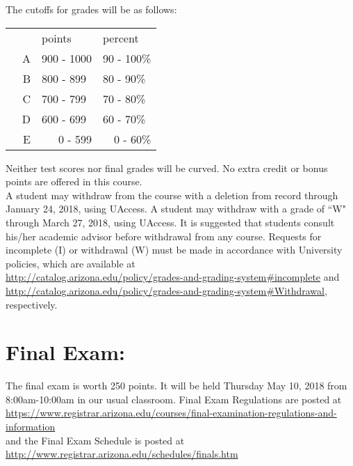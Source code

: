\documentclass[11pt]{article}
\begin{document}
\newpage
\hangindent=5cm 
The cutoffs for grades will be as follows:
\begin{center}
\begin{tabular}{rll}
  & points & percent \\[2mm]
~~A & 900 - 1000 & 90 - 100\% \\
B & 800 - 899 & 80 - 90\% \\
C & 700 - 799 & 70 - 80\% \\
D & 600 - 699 & 60 - 70\% \\
E & ~~~0   - 599 & ~~0  - 60\% 
\end{tabular}
\end{center}
\hangindent=5cm 
Neither test scores nor final grades will be curved.  
No extra credit or bonus points are offered in this course.\\

\hangindent=5cm 
A student may withdraw from the course with a deletion from record through January 24, 2018, using UAccess. A student may withdraw with a grade of ``W" through March 27, 2018, using UAccess. It is suggested that students consult his/her academic advisor before withdrawal from any course.
Requests for incomplete (I) or withdrawal (W) must be made in accordance with University policies, which are available at \\
\href{http://catalog.arizona.edu/policy/grades-and-grading-system#incomplete}{http://catalog.arizona.edu/policy/grades-and-grading-system\#incomplete} and\\
\href{http://catalog.arizona.edu/policy/grades-and-grading-system#Withdrawal}{http://catalog.arizona.edu/policy/grades-and-grading-system\#Withdrawal}, respectively.

\vspace{0.5cm}


\section{\textbf{Final Exam:}}
\vspace{-.65cm}
\hangindent=5cm 
The final exam is worth 250 points.  It will be held Thursday May 10, 2018 from 8:00am-10:00am in our usual classroom. 
Final Exam Regulations are posted at \\[1mm]
\href{https://www.registrar.arizona.edu/courses/final-examination-regulations-and-information}{https://www.registrar.arizona.edu/courses/final-examination-regulations-and-information}\\[1mm]
and the Final Exam Schedule is posted at\\[1mm]
 \href{http://www.registrar.arizona.edu/schedules/finals.htm}{http://www.registrar.arizona.edu/schedules/finals.htm}
\end{document}
